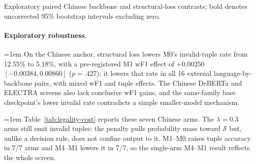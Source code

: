 \begin{table}[t]
  \centering
  \small
  \caption{Exploratory paired Chinese backbone and structural-loss contrasts;
  bold denotes uncorrected 95\% bootstrap intervals excluding zero.}
  \label{tab:legality-cost}
  \begingroup
  \small
  \setlength{\tabcolsep}{1.6pt}
  
  \endgroup
\end{table}

\paragraph{Exploratory robustness.}
\begingroup\emergencystretch=1em
On the Chinese anchor, structural loss lowers M0's invalid-tuple rate from
12.55\% to 5.18\%, with a pre-registered M1 wF1 effect of $+0.00250$
$[-0.00384,0.00860]$ ($p=.427$); it lowers that rate in all 16 external
language-by-backbone pairs, with mixed wF1 and tuple effects. The Chinese
DeBERTa and ELECTRA screens also lack conclusive wF1 gains, and the
same-family base checkpoint's lower invalid rate contradicts a simple
smaller-model mechanism.

\begingroup\emergencystretch=1em
Table~\ref{tab:legality-cost} reports these seven Chinese arms. The
$\lambda=0.3$ arms still emit invalid tuples: the penalty pulls probability
mass toward $\mathcal S$ but, unlike a decision rule, does not confine output
to it. M1--M0 raises tuple accuracy in 7/7 arms and M4--M1 lowers it in 7/7,
so the single-arm M4--M1 result reflects the whole screen.
\par\endgroup
\par\endgroup
